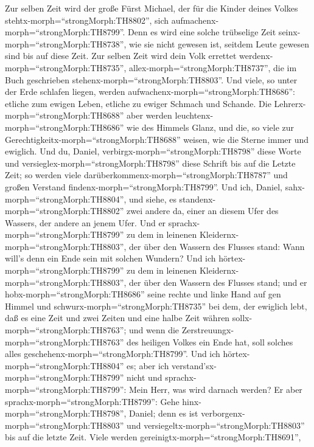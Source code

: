  Zur selben Zeit wird der große Fürst Michael, der für die
Kinder deines Volkes stehtx-morph=``strongMorph:TH8802'', sich
aufmachenx-morph=``strongMorph:TH8799''. Denn es wird eine solche
trübselige Zeit seinx-morph=``strongMorph:TH8738'', wie sie nicht
gewesen ist, seitdem Leute gewesen sind bis auf diese Zeit. Zur selben
Zeit wird dein Volk errettet werdenx-morph=``strongMorph:TH8735'',
allex-morph=``strongMorph:TH8737'', die im Buch geschrieben
stehenx-morph=``strongMorph:TH8803''.  Und viele, so unter
der Erde schlafen liegen, werden
aufwachenx-morph=``strongMorph:TH8686'': etliche zum ewigen Leben,
etliche zu ewiger Schmach und Schande.  Die
Lehrerx-morph=``strongMorph:TH8688'' aber werden
leuchtenx-morph=``strongMorph:TH8686'' wie des Himmels Glanz, und die,
so viele zur Gerechtigkeitx-morph=``strongMorph:TH8688'' weisen, wie die
Sterne immer und ewiglich.  Und du, Daniel,
verbirgx-morph=``strongMorph:TH8798'' diese Worte und
versieglex-morph=``strongMorph:TH8798'' diese Schrift bis auf die Letzte
Zeit; so werden viele darüberkommenx-morph=``strongMorph:TH8787'' und
großen Verstand findenx-morph=``strongMorph:TH8799''.  Und
ich, Daniel, sahx-morph=``strongMorph:TH8804'', und siehe, es
standenx-morph=``strongMorph:TH8802'' zwei andere da, einer an diesem
Ufer des Wassers, der andere an jenem Ufer.  Und er
sprachx-morph=``strongMorph:TH8799'' zu dem in leinenen
Kleidernx-morph=``strongMorph:TH8803'', der über den Wassern des Flusses
stand: Wann will's denn ein Ende sein mit solchen Wundern? 
Und ich hörtex-morph=``strongMorph:TH8799'' zu dem in leinenen
Kleidernx-morph=``strongMorph:TH8803'', der über den Wassern des Flusses
stand; und er hobx-morph=``strongMorph:TH8686'' seine rechte und linke
Hand auf gen Himmel und schwurx-morph=``strongMorph:TH8735'' bei dem,
der ewiglich lebt, daß es eine Zeit und zwei Zeiten und eine halbe Zeit
währen sollx-morph=``strongMorph:TH8763''; und wenn die
Zerstreuungx-morph=``strongMorph:TH8763'' des heiligen Volkes ein Ende
hat, soll solches alles geschehenx-morph=``strongMorph:TH8799''.
 Und ich hörtex-morph=``strongMorph:TH8804'' es; aber ich
verstand'sx-morph=``strongMorph:TH8799'' nicht und
sprachx-morph=``strongMorph:TH8799'': Mein Herr, was wird darnach
werden?  Er aber sprachx-morph=``strongMorph:TH8799'': Gehe
hinx-morph=``strongMorph:TH8798'', Daniel; denn es ist
verborgenx-morph=``strongMorph:TH8803'' und
versiegeltx-morph=``strongMorph:TH8803'' bis auf die letzte Zeit.
 Viele werden gereinigtx-morph=``strongMorph:TH8691'',
